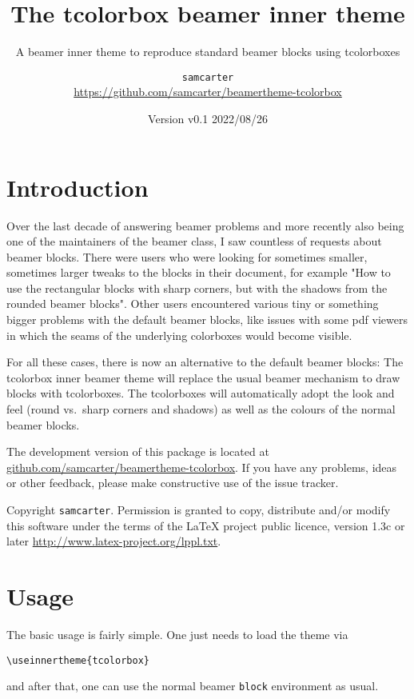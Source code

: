\documentclass[parskip=half]{scrartcl}
\title{The tcolorbox beamer inner theme}
\subtitle{A beamer inner theme to reproduce standard beamer blocks using tcolorboxes}
\author{%
	\texorpdfstring{
		\texttt{samcarter}\\
		\url{https://github.com/samcarter/beamertheme-tcolorbox}\\
	}{samcarter}}
\date{Version v0.1 \textendash{} 2022/08/26}
\newcommand{\CTAN}{\textsc{CTAN}\xspace}
\newcommand{\miktex}{MiK\TeX\xspace}
\newcommand{\texlive}{\TeX{}Live\xspace}
\begin{document}
\maketitle

\section{Introduction}
\label{intro}

Over the last decade of answering beamer problems and more recently also being one of the maintainers of the beamer class, I saw countless of requests about beamer blocks. There were users who were looking for sometimes smaller, sometimes larger tweaks to the blocks in their document, for example "How to use the rectangular blocks with sharp corners, but with the shadows from the rounded beamer blocks". Other users encountered various tiny or something bigger problems with the default beamer blocks, like issues with some pdf viewers in which the seams of the underlying colorboxes would become visible. 

For all these cases, there is now an alternative to the default beamer blocks: The tcolorbox inner beamer theme will replace the usual beamer mechanism to draw blocks with tcolorboxes. The tcolorboxes will automatically adopt the look and feel (round vs.\ sharp corners and shadows) as well as the colours of the normal beamer blocks.

The development version of this package is located at \url{github.com/samcarter/beamertheme-tcolorbox}. If you have any problems, ideas or other feedback, please make constructive use of the issue tracker.

Copyright  \texttt{samcarter}. Permission is granted to copy, distribute and\slash or modify this software under the terms of the LaTeX project public licence, version 1.3c or later \url{http://www.latex-project.org/lppl.txt}.

\section{Usage}

The basic usage is fairly simple. One just needs to load the theme via 
\begin{tcolorbox}
\begin{lstlisting}
\useinnertheme{tcolorbox}
\end{lstlisting}
\end{tcolorbox}
and after that, one can use the normal beamer \lstinline|block| environment as usual. 
\end{document}
